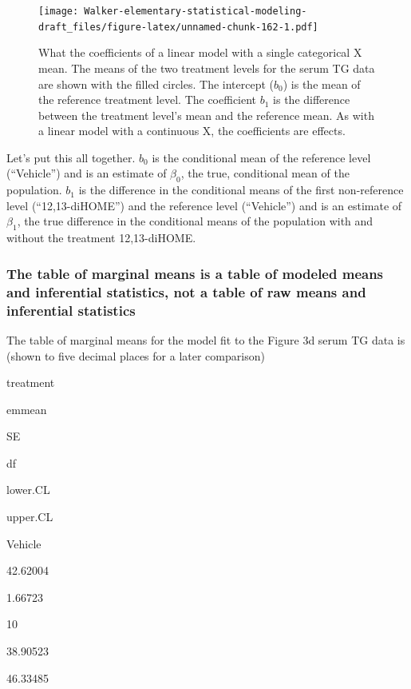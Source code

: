 \documentclass[]{book}
\begin{document}
\begin{figure}
\centering
\texttt{[image: Walker-elementary-statistical-modeling-draft\_files/figure-latex/unnamed-chunk-162-1.pdf]}
\caption{\label{fig:unnamed-chunk-162}What the coefficients of a linear model with a single categorical X mean. The means of the two treatment levels for the serum TG data are shown with the filled circles. The intercept (\(b_0\)) is the mean of the reference treatment level. The coefficient \(b_1\) is the difference between the treatment level's mean and the reference mean. As with a linear model with a continuous X, the coefficients are effects.}
\end{figure}

Let's put this all together. \(b_0\) is the conditional mean of the reference level (``Vehicle'') and is an estimate of \(\beta_0\), the true, conditional mean of the population. \(b_1\) is the difference in the conditional means of the first non-reference level (``12,13-diHOME'') and the reference level (``Vehicle'') and is an estimate of \(\beta_1\), the true difference in the conditional means of the population with and without the treatment 12,13-diHOME.

\hypertarget{the-table-of-marginal-means-is-a-table-of-modeled-means-and-inferential-statistics-not-a-table-of-raw-means-and-inferential-statistics}{%
\subsubsection{The table of marginal means is a table of modeled means and inferential statistics, not a table of raw means and inferential statistics}\label{the-table-of-marginal-means-is-a-table-of-modeled-means-and-inferential-statistics-not-a-table-of-raw-means-and-inferential-statistics}}

The table of marginal means for the model fit to the Figure 3d serum TG data is (shown to five decimal places for a later comparison)

treatment

emmean

SE

df

lower.CL

upper.CL

Vehicle

42.62004

1.66723

10

38.90523

46.33485
\end{document}
